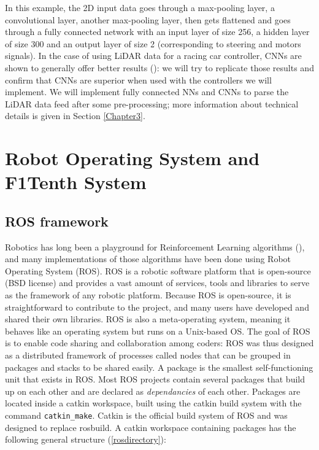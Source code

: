 In this example, the 2D input data goes through a max-pooling layer, a convolutional layer, another max-pooling layer, then gets flattened and goes through a fully connected network with an input layer of size 256, a hidden layer of size 300 and an output layer of size 2 (corresponding to steering and motors signals). \newline
In the case of using LiDAR data for a racing car controller, CNNs are shown to generally offer better results (\cite{bosello}): we will try to replicate those results and confirm that CNNs are superior when used with the controllers we will implement. We will implement fully connected NNs and CNNs to parse the LiDAR data feed after some pre-processing; more information about technical details is given in Section \ref{Chapter3}.

\section{Robot Operating System and F1Tenth System}
\label{rosandf1tenth}
\subsection{ROS framework}

Robotics has long been a playground for Reinforcement Learning algorithms (\cite{rlintro}), and many implementations of those algorithms have been done using Robot Operating System (ROS). ROS is a robotic software platform that is open-source (BSD license) and provides a vast amount of services, tools and libraries to serve as the framework of any robotic platform. Because ROS is open-source, it is straightforward to contribute to the project, and many users have developed and shared their own libraries. ROS is also a meta-operating system, meaning it behaves like an operating system but runs on a Unix-based OS. The goal of ROS is to enable code sharing and collaboration among coders: ROS was thus designed as a distributed framework of processes called nodes that can be grouped in packages and stacks to be shared easily. A package is the smallest self-functioning unit that exists in ROS. Most ROS projects contain several packages that build up on each other and are declared as \textit{dependancies} of each other. Packages are located inside a catkin workspace, built using the catkin build system with the command \verb |catkin_make|. Catkin is the official build system of ROS and was designed to replace rosbuild. A catkin workspace containing packages has the following general structure (\ref{rosdirectory}):

